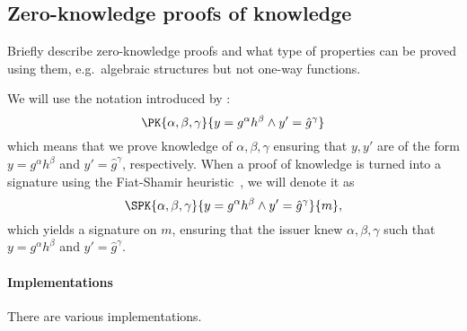 \subsection{Zero-knowledge proofs of knowledge}%
\label{ZKPK}

Briefly describe zero-knowledge proofs and what type of properties can be proved 
using them, e.g.\ algebraic structures but not one-way functions.

We will use the notation introduced by \citet{PKnotation}:
\begin{equation*}
  \PK{\alpha, \beta, \gamma}
  {y = g^\alpha h^\beta \land y' = \hat g^\gamma}
\end{equation*}
which means that we prove knowledge of \(\alpha, \beta, \gamma\) ensuring that 
\(y, y'\) are of the form \(y = g^\alpha h^\beta\) and \(y' = \hat g^\gamma\), 
respectively.
When a proof of knowledge is turned into a signature using the Fiat-Shamir 
heuristic~\cite{FiatShamirHeuristic}, we will denote it as
\begin{equation*}
  \SPK{\alpha, \beta, \gamma}
  {y = g^\alpha h^\beta \land y' = \hat g^\gamma}
  {m},
\end{equation*}
which yields a signature on \(m\), ensuring that the issuer knew \(\alpha, 
  \beta, \gamma\) such that \(y = g^\alpha h^\beta\) and \(y' = \hat g^\gamma\).


\paragraph{Implementations}

There are various implementations.
